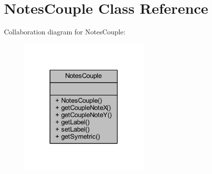 \hypertarget{class_notes_couple}{}\section{Notes\+Couple Class Reference}
\label{class_notes_couple}


Collaboration diagram for Notes\+Couple\+:\nopagebreak
\begin{figure}[H]
\begin{center}
\leavevmode
\includegraphics[width=182pt]{class_notes_couple__coll__graph}
\end{center}
\end{figure}
